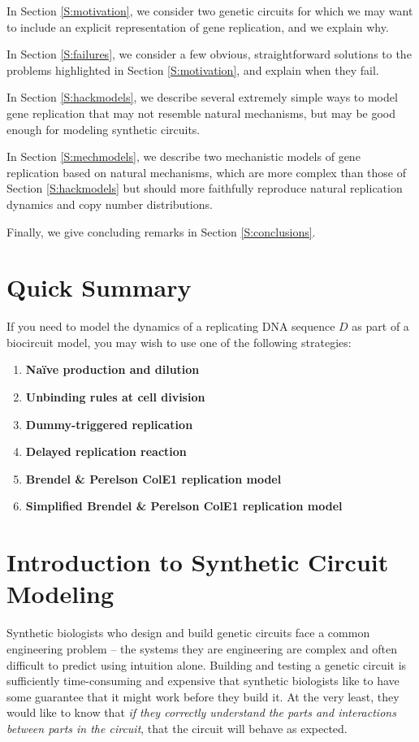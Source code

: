 \documentclass[preprint,12pt]{elsarticle}
\begin{document}
In Section \ref{S:motivation}, we consider two genetic circuits for which we may want to include an explicit representation of gene replication, and we explain why.

In Section \ref{S:failures}, we consider a few obvious, straightforward solutions to the problems highlighted in Section \ref{S:motivation}, and explain when they fail.

In Section \ref{S:hackmodels}, we describe several extremely simple ways to model gene replication that may not resemble natural mechanisms, but may be good enough for modeling synthetic circuits.

In Section \ref{S:mechmodels}, we describe two mechanistic models of gene replication based on natural mechanisms, which are more complex than those of Section \ref{S:hackmodels} but should more faithfully reproduce natural replication dynamics and copy number distributions. 

Finally, we give concluding remarks in Section \ref{S:conclusions}.

\section{Quick Summary}\label{S:quick}

If you need to model the dynamics of a replicating DNA sequence $D$ as part of a biocircuit model, you may wish to use one of the following strategies:

\begin{enumerate}
	\item \textbf{Na\"ive production and dilution}
	\item \textbf{Unbinding rules at cell division}
	\item \textbf{Dummy-triggered replication}
	\item \textbf{Delayed replication reaction}
	\item \textbf{Brendel \& Perelson ColE1 replication model}
	\item \textbf{Simplified Brendel \& Perelson ColE1 replication model}	
\end{enumerate}

\section{Introduction to Synthetic Circuit Modeling}
\label{S:intro}

Synthetic biologists who design and build genetic circuits face a common engineering problem -- the systems they are engineering are complex and often difficult to predict using intuition alone. Building and testing a genetic circuit is sufficiently time-consuming and expensive that synthetic biologists like to have some guarantee that it might work before they build it. At the very least, they would like to know that \emph{if they correctly understand the parts and interactions between parts in the circuit}, that the circuit will behave as expected. 
\end{document}
